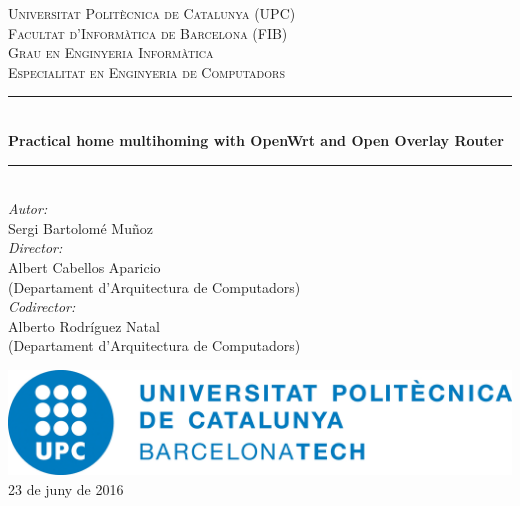 \documentclass[11pt]{article}
\begin{document}
\begin{titlepage}
\newcommand{\HRule}{\rule{\linewidth}{0.5mm}} %

\begin{center}

\textsc{\LARGE Universitat Politècnica de Catalunya (UPC)}\\[1.5cm]
\textsc{\Large Facultat d'Informàtica de Barcelona (FIB)}\\[0.5cm]
\textsc{\large Grau en Enginyeria Informàtica\\Especialitat en Enginyeria de Computadors}\\[1.5cm]

\HRule \\[0.4cm]
{\huge \bfseries Practical home multihoming with OpenWrt and Open Overlay Router}\\
\HRule \\[1.5cm]

{\Large \emph{Autor:}\\
Sergi Bartolomé Muñoz}\\[1cm]
{\large \emph{Director:}\\
Albert Cabellos Aparicio\\
(Departament d'Arquitectura de Computadors)\\[0.5cm]
\emph{Codirector:}\\
Alberto Rodríguez Natal\\
(Departament d'Arquitectura de Computadors)}

\bigskip
\vfill

\includegraphics[scale=0.5]{upc}\\[1cm]

{\large 23 de juny de 2016}\\[3cm]

\end{center}
\end{titlepage}

\newpage
\setcounter{page}{0}					%
\thispagestyle{empty}
\mbox{}
\vfill
\end{document}
